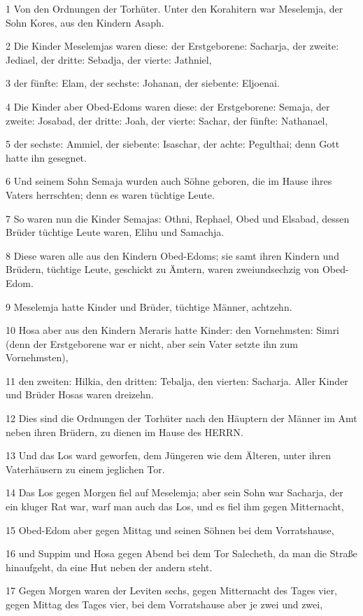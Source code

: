 \par 1 Von den Ordnungen der Torhüter. Unter den Korahitern war Meselemja, der Sohn Kores, aus den Kindern Asaph.
\par 2 Die Kinder Meselemjas waren diese: der Erstgeborene: Sacharja, der zweite: Jediael, der dritte: Sebadja, der vierte: Jathniel,
\par 3 der fünfte: Elam, der sechste: Johanan, der siebente: Eljoenai.
\par 4 Die Kinder aber Obed-Edoms waren diese: der Erstgeborene: Semaja, der zweite: Josabad, der dritte: Joah, der vierte: Sachar, der fünfte: Nathanael,
\par 5 der sechste: Ammiel, der siebente: Isaschar, der achte: Pegulthai; denn Gott hatte ihn gesegnet.
\par 6 Und seinem Sohn Semaja wurden auch Söhne geboren, die im Hause ihres Vaters herrschten; denn es waren tüchtige Leute.
\par 7 So waren nun die Kinder Semajas: Othni, Rephael, Obed und Elsabad, dessen Brüder tüchtige Leute waren, Elihu und Samachja.
\par 8 Diese waren alle aus den Kindern Obed-Edoms; sie samt ihren Kindern und Brüdern, tüchtige Leute, geschickt zu Ämtern, waren zweiundsechzig von Obed-Edom.
\par 9 Meselemja hatte Kinder und Brüder, tüchtige Männer, achtzehn.
\par 10 Hosa aber aus den Kindern Meraris hatte Kinder: den Vornehmsten: Simri (denn der Erstgeborene war er nicht, aber sein Vater setzte ihn zum Vornehmsten),
\par 11 den zweiten: Hilkia, den dritten: Tebalja, den vierten: Sacharja. Aller Kinder und Brüder Hosas waren dreizehn.
\par 12 Dies sind die Ordnungen der Torhüter nach den Häuptern der Männer im Amt neben ihren Brüdern, zu dienen im Hause des HERRN.
\par 13 Und das Los ward geworfen, dem Jüngeren wie dem Älteren, unter ihren Vaterhäusern zu einem jeglichen Tor.
\par 14 Das Los gegen Morgen fiel auf Meselemja; aber sein Sohn war Sacharja, der ein kluger Rat war, warf man auch das Los, und es fiel ihm gegen Mitternacht,
\par 15 Obed-Edom aber gegen Mittag und seinen Söhnen bei dem Vorratshause,
\par 16 und Suppim und Hosa gegen Abend bei dem Tor Salecheth, da man die Straße hinaufgeht, da eine Hut neben der andern steht.
\par 17 Gegen Morgen waren der Leviten sechs, gegen Mitternacht des Tages vier, gegen Mittag des Tages vier, bei dem Vorratshause aber je zwei und zwei,
